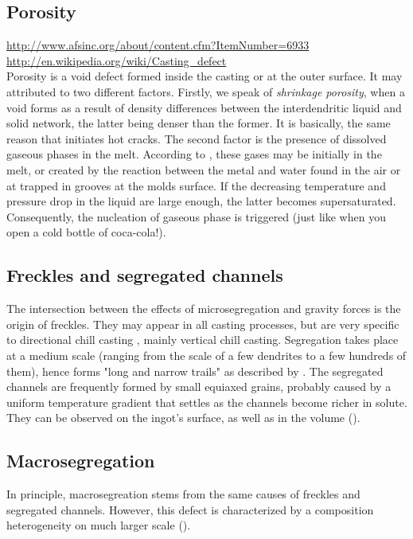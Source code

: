 \subsection*{Porosity}
\url{http://www.afsinc.org/about/content.cfm?ItemNumber=6933} \\
\url{http://en.wikipedia.org/wiki/Casting_defect} \\
Porosity is a void defect formed inside the casting or at the outer surface. It may attributed to two different factors.
Firstly, we speak of \emph{shrinkage porosity}, when a void forms as a result of density differences between the interdendritic liquid and solid
network, the latter being denser than the former. It is basically, the same reason that initiates hot cracks. 
The second factor is the presence of dissolved gaseous phases in the melt. According to \citet{dantzig_solidification_2009}, these gases may be initially in the melt, or created by the reaction between the metal and water found in the air or at trapped in grooves at the molds surface. If the decreasing temperature and pressure drop in the liquid are large enough, the latter becomes supersaturated. Consequently, the nucleation of gaseous phase is triggered (just like when you open a cold bottle of coca-cola!).

\subsection*{Freckles and segregated channels} 
The intersection between the effects of microsegregation and gravity forces is the origin of freckles. They may appear 
in all casting processes, but are very specific to directional chill casting \citep{giamei_nature_1970}, mainly vertical chill casting. 
Segregation takes place at a medium scale (ranging from the scale of a few dendrites to a few hundreds of them), hence forms "long and narrow trails" as described by \citet{felicelli_simulation_1991}. The segregated channels are frequently formed by small equiaxed grains, probably caused by a uniform temperature
gradient that settles as the channels become richer in solute. They can be observed on the ingot's surface, as well as in the volume ().

\subsection*{Macrosegregation}
In principle, macrosegreation stems from the same causes of freckles and segregated channels. However, this defect is characterized by a composition heterogeneity on much larger scale (). 

